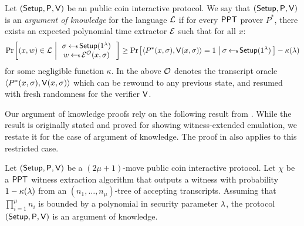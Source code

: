 \begin{definition}\label{def:argofknowledge}
Let $(\mathsf{Setup},\mathsf{P},\mathsf{V})$ be an public coin interactive protocol. We say that
$(\mathsf{Setup},\mathsf{P},\mathsf{V})$ is an {\em argument of knowledge} for the language
$\mathcal{L}$ if for every $\mathsf{PPT}$
prover $P^\ast$, there exists an expected polynomial time extractor $\mathcal{E}$ such that for all $x$:
\begin{align}
\condprob{(x,w)\in \mc{L}}{
\begin{array}{c}
\sigma\sample\setup(\secparam) \\
w\sample \extr^{\mc{O}}(x,\sigma)
\end{array}
}
\geq \condprob{\langle
P^\ast(x,\sigma),\verifier(x,\sigma)\rangle=1}{\sigma\sample \setup(\secparam)} -
\kappa(\lambda)
\end{align}
for some negligible function $\kappa$. In the above $\mathcal{O}$ denotes the
transcript oracle $\langle P^\ast(x,\sigma),\mathsf{V}(x,\sigma)\rangle$ which
can be rewound to any previous state, and resumed with fresh randomness for the
verifier $\mathsf{V}$.
\end{definition}

Our argument of knowledge proofs rely on the following result from \cite{Bulletproofs}.
While the result is originally stated and proved for showing witness-extended
emulation, we restate it for the case of argument of knowledge. The proof in
\cite{InnerProductDLS} also applies to this restricted case.

\begin{lemma}\label{lem:forkinglemma}
Let $(\mathsf{Setup},\mathsf{P},\mathsf{V})$ be a $(2\mu+1)$-move public coin interactive
protocol. Let $\chi$ be a $\mathsf{PPT}$ witness extraction algorithm that outputs a
witness with probability $1-\kappa(\lambda)$ from an $(n_1,\ldots,n_\mu)$-tree
of accepting transcripts. Assuming that $\prod_{i=1}^\mu n_i$ is bounded by a
polynomial in security parameter $\lambda$, the protocol
$(\mathsf{Setup},\mathsf{P},\mathsf{V})$ is an argument of knowledge.
\end{lemma}

